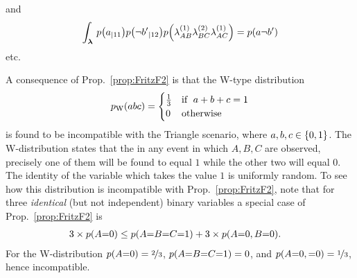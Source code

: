 and 
\begin{align*}
\int_{\setlambda}\,\p{a_{|11}}\p{{\nb'}_{|12}}\p{\lambda_{AB}^{(1)}\lambda_{BC}^{(2)}\lambda_{AC}^{(1)}}=\p{a\nb'}
\end{align*}
etc.


\begin{comment}
Accounting for the causal structure, then, the implication of \cref{taut:Spekkens} is
\begin{prop} \label{prop:TriNoGo}
The Triangle causal structure (\cref{fig:TriDAG}) implies that, for any $\brackets{\nap,\nbp,\ncp}$,
\begin{align}
{\rm if  }\;\; &\p{a\, b'}=\p{a},\label{eq:AimpNotBsource}\\
{\rm and }\;\; &\p{b\, c'}=\p{b},\label{eq:BimpNotCsource}\\
{\rm and }\;\; &\p{c\, a'}=\p{c},\label{eq:CimpNotAsource}\\
{\rm then }\;\; &\p{a}\p{b}\p{c}\leq \p{a' b' c'}.\label{eq:spekkensresult}
\end{align}
\end{prop}
\end{comment}

A consequence of Prop.~\ref{prop:FritzF2} is that the W-type distribution
\begin{align}\label{eq:wdistribution}
p_{\text{W}}\lparen abc\rparen=\begin{cases}\tfrac{1}{3}&\text{if }\; a+b+c=1 \\ 0&\text{otherwise}\end{cases}
\end{align}
is found to be incompatible with the Triangle scenario, where $a,b,c\in\left\lbrace0,1\right\rbrace$. The W-distribution states that the in any event in which $A,B,C$ are observed, precisely one of them will be found to equal $1$ while the other two will equal $0$. The identity of the variable which takes the value $1$ is uniformly random. 
To see how this distribution is incompatible with Prop.~\ref{prop:FritzF2}, note that for three \emph{identical} (but not independent) binary variables a special case of Prop.~\ref{prop:FritzF2} is
\begin{align*}\begin{split}
3\times\p{A\cramp{=}0}&\leq \p{A\cramp{=}B\cramp{=}C\cramp{=}1} + 3\times\p{A\cramp{=}0,B\cramp{=}0}.
\end{split}\end{align*}
For the W-distribution $\p{A\cramp{=}0}=\nicefrac{2}{3}$, $\p{A\cramp{=}B\cramp{=}C\cramp{=}1}=0$, and $\p{A\cramp{=}0,\cramp{=}0}=\nicefrac{1}{3}$, hence incompatible.


